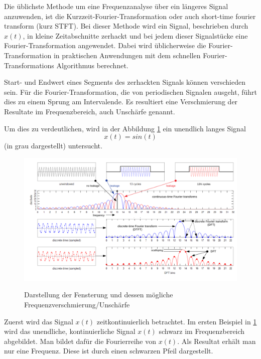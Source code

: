 
Die üblichste Methode um eine Frequenzanalyse über ein längeres Signal anzuwenden, ist die  Kurzzeit-Fourier-Transformation oder auch short-time fourier transform (kurz STFT). Bei dieser Methode wird ein Signal, beschrieben durch $x(t)$, in kleine Zeitabschnitte zerhackt und bei jedem dieser Signalstücke eine Fourier-Transformation angewendet. Dabei wird üblicherweise die Fourier-Transformation in praktischen Anwendungen mit dem schnellen Fourier-Transformations Algorithmus berechnet.

Start- und Endwert eines Segments des zerhackten Signals können verschieden sein. Für die Fourier-Transformation, die von periodischen Signalen ausgeht, führt dies zu einem Sprung am Intervalende. Es resultiert eine Verschmierung der Resultate im Frequenzbereich, auch Unschärfe genannt. 

Um dies zu verdeutlichen, wird in der Abbildung \ref{fig:Spectral} ein unendlich langes Signal 
\[x(t)=sin(t)\]
(in grau dargestellt) untersucht.

\begin{figure}[!ht]
	\centering
	\includegraphics[scale=0.8]{papers/autotune/sections/fft/images/windows/Spectral.pdf}
	\caption{Darstellung der Fensterung und dessen mögliche Frequenzverschmierung/Unschärfe}\cite{wikipedia:Window}
	\label{fig:Spectral}
\end{figure}%

Zuerst wird das Signal $x(t)$ zeitkontinuierlich betrachtet. Im ersten Beispiel in \ref{fig:Spectral} wird das unendliche, kontinuierliche Signal $x(t)$ schwarz im Frequenzbereich abgebildet. Man bildet dafür die Fourierreihe von $x(t)$. Als Resultat erhält man nur eine Frequenz. Diese ist durch einen schwarzen Pfeil dargestellt.

